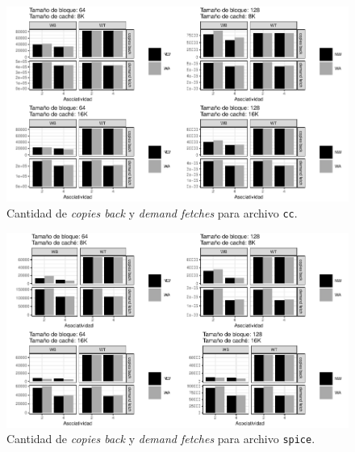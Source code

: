 \documentclass{article}
\begin{document}
\begin{figure}[H]
    \centering
    \includegraphics[width=\textwidth]{4_memory_bandwidth_wna_wa_cc.pdf}
    \caption{Cantidad de \textit{copies back} y \textit{demand fetches} para archivo \texttt{cc}.}
    \label{fig:4_memory_bandwidth_cc}
\end{figure}

\begin{figure}[H]
\centering
    \includegraphics[width=\textwidth]{4_memory_bandwidth_wna_wa_spice.pdf}
    \caption{Cantidad de \textit{copies back} y \textit{demand fetches} para archivo \texttt{spice}.}
    \label{fig:4_memory_bandwidth_spice}
\end{figure}
\end{document}
